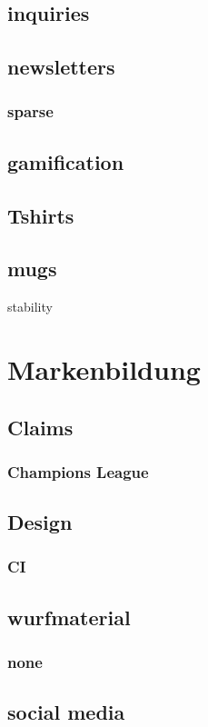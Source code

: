 \documentclass[guidelines,nonflat,modfonts] {langsci/langscibook}
\begin{document}
\subsection{inquiries}
\subsection{newsletters}
\subsubsection{sparse}
\subsection{gamification}
\subsection{Tshirts}
\subsection{mugs}

stability 
\section{Markenbildung}
\subsection{Claims}
\subsubsection{Champions League}
\subsection{Design}
\subsubsection{CI}
\subsection{wurfmaterial}
\subsubsection{none}
\subsection{social media}
\end{document}
